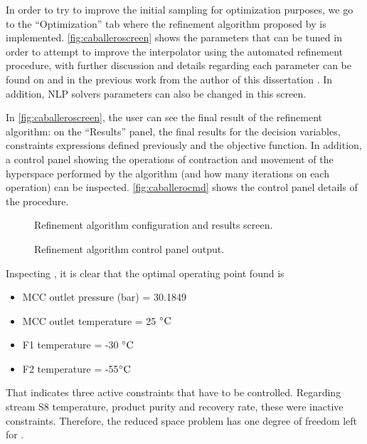 \documentclass[../../msc-thesis.tex]{subfiles}
\begin{document}
In order to try to improve the initial sampling for optimization purposes, 
we go to the ``Optimization'' tab where the refinement algorithm proposed by 
\textcite{Caballero2008} is implemented. \autoref{fig:caballeroscreen} 
shows the parameters that can be tuned in order to attempt to improve the 
\kriging interpolator using the automated refinement procedure, with further 
discussion and details regarding each parameter can be found on 
\textcite{caballero2008} and in the previous work from the author of this 
dissertation \cite{Alves2018}. In addition, NLP solvers parameters can 
also be changed in this screen. 

In \autoref{fig:caballeroscreen}, the user can see the final result of 
the refinement algorithm: on the ``Results'' panel, the final results for 
the decision variables, constraints expressions defined previously and the
objective function. In addition, a control panel showing the operations of
contraction and movement of the hyperspace performed by the algorithm 
(and how many iterations on each operation) can be inspected.  
\autoref{fig:caballerocmd} shows the control panel details of the procedure.

\begin{figure}[htb]
    \centering
    \caption{Refinement algorithm configuration and results screen.}
    \label{fig:caballeroscreen}
\end{figure}

\begin{figure}[htb]
    \centering
    \caption{Refinement algorithm control panel output.}
    \label{fig:caballerocmd}
\end{figure}

Inspecting , it is clear that
the optimal operating point found is

\begin{itemize}
    \item MCC outlet pressure (bar) = 30.1849
    \item MCC outlet temperature = 25 $\celsius$
    \item F1  temperature = -30 $\celsius$
    \item F2  temperature = -55$\celsius$
\end{itemize}

That indicates three active constraints that have to be controlled. 
Regarding stream S8 temperature, \co product purity and recovery rate,
these were inactive constraints. Therefore, the reduced space problem has one
degree of freedom left for \soc.
\end{document}
